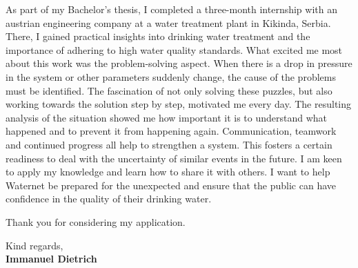 \documentclass[11pt]{report}
\begin{document}
\begin{titlepage}
\vspace{0.7em}

As part of my Bachelor's thesis, I completed a three-month internship with an austrian engineering company at a water treatment plant in Kikinda, Serbia. There, I gained practical insights into drinking water treatment and the importance of adhering to high water quality standards. 
What excited me most about this work was the problem-solving aspect. When there is a drop in pressure in the system or other parameters suddenly change, the cause of the problems must be identified. The fascination of not only solving 
these puzzles, but also working towards the solution step by step, motivated me every day. The resulting analysis of the situation showed me how important it is to understand what happened and to prevent it from happening again. 
Communication, teamwork and continued progress all help to strengthen a system. This fosters a certain readiness to deal with the uncertainty of similar events in the future. I am keen to apply my knowledge and learn how to share it with others. 
I want to help Waternet be prepared for the unexpected and ensure that the public can have confidence in the quality of their drinking water.

\vspace{0.7em}

Thank you for considering my application.

\vspace{0.7em}

\raggedright Kind regards,\\
\textbf{Immanuel Dietrich}

\end{titlepage}
\end{document}

